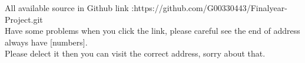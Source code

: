 All available source in Github link :https://github.com/G00330443/Finalyear-Project.git
\\ 
Have some problems when you click the link, please careful see the end of address always have [numbers].\\
Please delect it then you can visit the correct address, sorry about that.\\